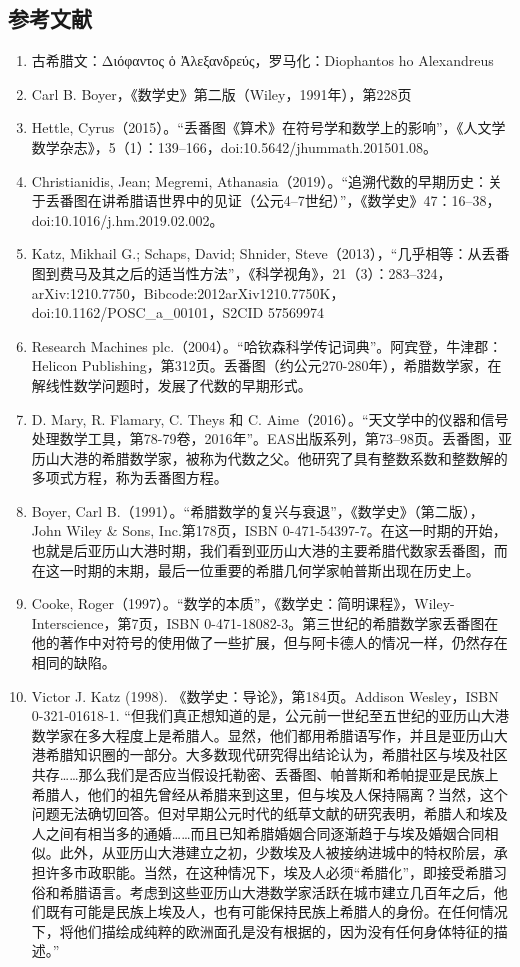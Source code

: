 \subsection{参考文献}  
\begin{enumerate}
\item 古希腊文：Διόφαντος ὁ Ἀλεξανδρεύς，罗马化：Diophantos ho Alexandreus  
\item Carl B. Boyer，《数学史》第二版（Wiley，1991年），第228页  
\item Hettle, Cyrus（2015）。“丢番图《算术》在符号学和数学上的影响”，《人文学数学杂志》，5（1）：139–166，doi:10.5642/jhummath.201501.08。  
\item Christianidis, Jean; Megremi, Athanasia（2019）。“追溯代数的早期历史：关于丢番图在讲希腊语世界中的见证（公元4–7世纪）”，《数学史》47：16–38，doi:10.1016/j.hm.2019.02.002。  
\item Katz, Mikhail G.; Schaps, David; Shnider, Steve（2013），“几乎相等：从丢番图到费马及其之后的适当性方法”，《科学视角》，21（3）：283–324，arXiv:1210.7750，Bibcode:2012arXiv1210.7750K，doi:10.1162/POSC_a_00101，S2CID 57569974  
\item Research Machines plc.（2004）。“哈钦森科学传记词典”。阿宾登，牛津郡：Helicon Publishing，第312页。丢番图（约公元270-280年），希腊数学家，在解线性数学问题时，发展了代数的早期形式。  
\item D. Mary, R. Flamary, C. Theys 和 C. Aime（2016）。“天文学中的仪器和信号处理数学工具，第78-79卷，2016年”。EAS出版系列，第73–98页。丢番图，亚历山大港的希腊数学家，被称为代数之父。他研究了具有整数系数和整数解的多项式方程，称为丢番图方程。  
\item Boyer, Carl B.（1991）。“希腊数学的复兴与衰退”，《数学史》（第二版），John Wiley & Sons, Inc.第178页，ISBN 0-471-54397-7。在这一时期的开始，也就是后亚历山大港时期，我们看到亚历山大港的主要希腊代数家丢番图，而在这一时期的末期，最后一位重要的希腊几何学家帕普斯出现在历史上。  
\item Cooke, Roger（1997）。“数学的本质”，《数学史：简明课程》，Wiley-Interscience，第7页，ISBN 0-471-18082-3。第三世纪的希腊数学家丢番图在他的著作中对符号的使用做了一些扩展，但与阿卡德人的情况一样，仍然存在相同的缺陷。
\item Victor J. Katz (1998). 《数学史：导论》，第184页。Addison Wesley，ISBN 0-321-01618-1.  
“但我们真正想知道的是，公元前一世纪至五世纪的亚历山大港数学家在多大程度上是希腊人。显然，他们都用希腊语写作，并且是亚历山大港希腊知识圈的一部分。大多数现代研究得出结论认为，希腊社区与埃及社区共存……那么我们是否应当假设托勒密、丢番图、帕普斯和希帕提亚是民族上希腊人，他们的祖先曾经从希腊来到这里，但与埃及人保持隔离？当然，这个问题无法确切回答。但对早期公元时代的纸草文献的研究表明，希腊人和埃及人之间有相当多的通婚……而且已知希腊婚姻合同逐渐趋于与埃及婚姻合同相似。此外，从亚历山大港建立之初，少数埃及人被接纳进城中的特权阶层，承担许多市政职能。当然，在这种情况下，埃及人必须“希腊化”，即接受希腊习俗和希腊语言。考虑到这些亚历山大港数学家活跃在城市建立几百年之后，他们既有可能是民族上埃及人，也有可能保持民族上希腊人的身份。在任何情况下，将他们描绘成纯粹的欧洲面孔是没有根据的，因为没有任何身体特征的描述。”

\end{enumerate}
